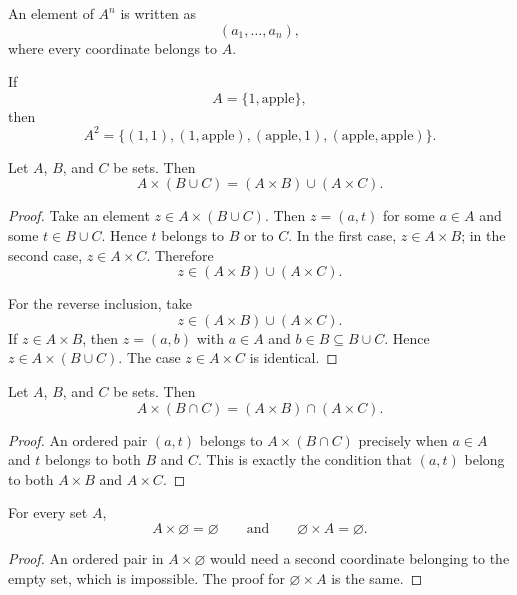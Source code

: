 An element of \(A^n\) is written as
\[
  (a_1,\ldots,a_n),
\]
where every coordinate belongs to \(A\).

\begin{example}
If
\[
  A=\{1,\text{apple}\},
\]
then
\[
  A^2
  =
  \{
    (1,1),
    (1,\text{apple}),
    (\text{apple},1),
    (\text{apple},\text{apple})
  \}.
\]
\end{example}

\begin{proposition}
Let \(A\), \(B\), and \(C\) be sets. Then
\[
  A\times(B\cup C)
  =
  (A\times B)\cup(A\times C).
\]
\end{proposition}

\begin{proof}
Take an element \(z\in A\times(B\cup C)\). Then \(z=(a,t)\) for some
\(a\in A\) and some \(t\in B\cup C\). Hence \(t\) belongs to \(B\) or
to \(C\). In the first case, \(z\in A\times B\); in the second case,
\(z\in A\times C\). Therefore
\[
  z\in(A\times B)\cup(A\times C).
\]

For the reverse inclusion, take
\[
  z\in(A\times B)\cup(A\times C).
\]
If \(z\in A\times B\), then \(z=(a,b)\) with \(a\in A\) and
\(b\in B\subseteq B\cup C\). Hence \(z\in A\times(B\cup C)\).
The case \(z\in A\times C\) is identical.
\end{proof}

\begin{proposition}
Let \(A\), \(B\), and \(C\) be sets. Then
\[
  A\times(B\cap C)
  =
  (A\times B)\cap(A\times C).
\]
\end{proposition}

\begin{proof}
An ordered pair \((a,t)\) belongs to \(A\times(B\cap C)\) precisely
when \(a\in A\) and \(t\) belongs to both \(B\) and \(C\). This is
exactly the condition that \((a,t)\) belong to both \(A\times B\) and
\(A\times C\).
\end{proof}

\begin{proposition}
For every set \(A\),
\[
  A\times\varnothing=\varnothing
  \qquad\text{and}\qquad
  \varnothing\times A=\varnothing.
\]
\end{proposition}

\begin{proof}
An ordered pair in \(A\times\varnothing\) would need a second coordinate
belonging to the empty set, which is impossible. The proof for
\(\varnothing\times A\) is the same.
\end{proof}



